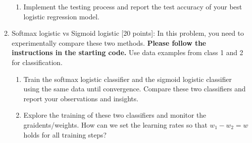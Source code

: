 \documentclass[11pt]{article}
\begin{document}
\begin{enumerate}
\begin{enumerate}
    \item Implement the testing process and report the test accuracy of your best logistic regression model.
\end{enumerate}


    \item Softmax logistic vs Sigmoid logistic [20 points]: In this problem, you need to experimentally compare these two methods.  \textbf{Please follow the instructions in the starting code.} Use data examples from class 1 and 2 for classification.
\begin{enumerate}
    \item Train the softmax logistic classifier and the sigmoid logistic classifier using the same data until convergence. Compare these two classifiers and report your observations and insights.

    \item Explore the training of these two classifiers and monitor the graidents/weights. How can we set the learning rates so that $w_1-w_2= w$ holds for all training steps?

\end{enumerate}

\end{enumerate}
\end{document}
